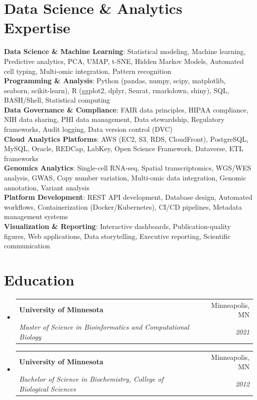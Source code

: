 \documentclass[letterpaper,11pt]{article}
\makeatletter
\newcommand{\resumeSubheading}[4]{
  \vspace{-2pt}\item
    \begin{tabular*}{0.97\textwidth}[t]{l@{\extracolsep{\fill}}r}
      \textbf{#1} & #2 \\
      \textit{\small#3} & \textit{\small #4} \\
    \end{tabular*}\vspace{-7pt}
}
\newcommand{\resumeSubHeadingListStart}{\begin{itemize}[leftmargin=0.15in, label={}]}
\newcommand{\resumeSubHeadingListEnd}{\end{itemize}}
\makeatother
\begin{document}
\section{Data Science \& Analytics Expertise}
 \begin{itemize}[leftmargin=0.15in, label={}]
    \small{\item{
     \textbf{Data Science \& Machine Learning}{: Statistical modeling, Machine learning, Predictive analytics, PCA, UMAP, t-SNE, Hidden Markov Models, Automated cell typing, Multi-omic integration, Pattern recognition} \\
     \textbf{Programming \& Analysis}{: Python (pandas, numpy, scipy, matplotlib, seaborn, scikit-learn), R (ggplot2, dplyr, Seurat, rmarkdown, shiny), SQL, BASH/Shell, Statistical computing} \\
     \textbf{Data Governance \& Compliance}{: FAIR data principles, HIPAA compliance, NIH data sharing, PHI data management, Data stewardship, Regulatory frameworks, Audit logging, Data version control (DVC)} \\
     \textbf{Cloud Analytics Platforms}{: AWS (EC2, S3, RDS, CloudFront), PostgreSQL, MySQL, Oracle, REDCap, LabKey, Open Science Framework, Dataverse, ETL frameworks} \\
     \textbf{Genomics Analytics}{: Single-cell RNA-seq, Spatial transcriptomics, WGS/WES analysis, GWAS, Copy number variation, Multi-omic data integration, Genomic annotation, Variant analysis} \\
     \textbf{Platform Development}{: REST API development, Database design, Automated workflows, Containerization (Docker/Kubernetes), CI/CD pipelines, Metadata management systems} \\
     \textbf{Visualization \& Reporting}{: Interactive dashboards, Publication-quality figures, Web applications, Data storytelling, Executive reporting, Scientific communication}
    }}
 \end{itemize}

\section{Education}
  \resumeSubHeadingListStart
    \resumeSubheading
      {University of Minnesota}{Minneapolis, MN}
      {Master of Science in Bioinformatics and Computational Biology}{2021}
    \resumeSubheading
      {University of Minnesota}{Minneapolis, MN}
      {Bachelor of Science in Biochemistry, College of Biological Sciences}{2012}
  \resumeSubHeadingListEnd
\end{document}

